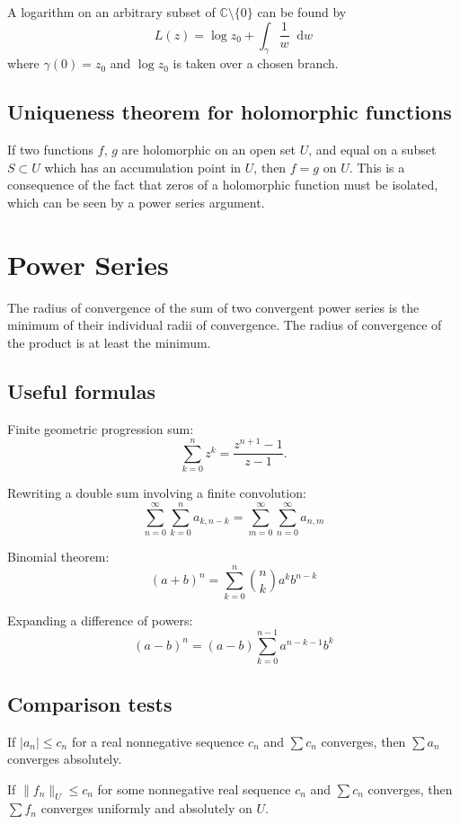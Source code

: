 \documentclass{article}
\newcommand\dif{\mathop{}\!\mathrm{d}}
\begin{document}
A logarithm on an arbitrary subset of
$\mathbb{C} \setminus \{ 0 \}$ can be found by
$$
  L(z)
= \log z_0 + \int_\gamma \frac{1}{w} \dif w
$$
where $\gamma(0) = z_0$ and $\log z_0$ is taken over a chosen
branch.

\subsection{Uniqueness theorem for holomorphic functions}

If two functions $f$, $g$ are holomorphic on an open set
$U$, and equal on a subset $S \subset U$ which has an
accumulation point in $U$, then $f = g$ on $U$. This is a
consequence of the fact that zeros of a holomorphic function
must be isolated, which can be seen by a power series
argument.

\section{Power Series}

The radius of convergence of the sum of two convergent power series is
the minimum of their individual radii of convergence. The radius of
convergence of the product is at least the minimum.

\subsection{Useful formulas}
Finite geometric progression sum:
$$
  \sum_{k=0}^n z^k
= \frac{z^{n+1} - 1}
       {z - 1}.
$$

Rewriting a double sum involving a finite convolution:
$$
  \sum_{n=0}^\infty
  \sum_{k=0}^n
    a_{k,n-k}
= \sum_{m=0}^\infty
  \sum_{n=0}^\infty
    a_{n,m}
$$

Binomial theorem:
$$
  (a + b)^n
= \sum_{k=0}^n
    {n \choose k}
    a^k
    b^{n-k}
$$

Expanding a difference of powers:
$$
  (a - b)^n
= (a - b)
  \sum_{k=0}^{n-1}
    a^{n - k - 1} b^k
$$

\subsection{Comparison tests}
If $|a_n| \leq c_n$ for a real nonnegative
sequence $c_n$ and $\sum c_n$ converges, then
$\sum a_n$ converges absolutely.

If $\| f_n \|_U \leq c_n$ for some nonnegative real sequence
$c_n$ and $\sum c_n$ converges, then $\sum f_n$
converges uniformly and absolutely on $U$.
\end{document}
